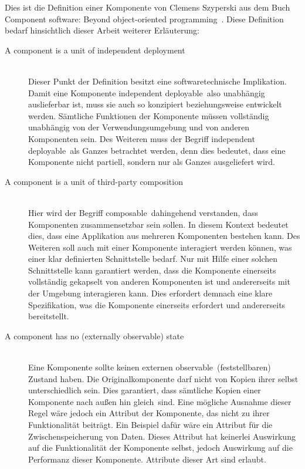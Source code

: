 Dies ist die Definition einer Komponente von Clemens Szyperski aus dem Buch \glqq Component software: Beyond object-oriented programming\grqq\ \citereset \autocite[siehe][S. 35-38]{Szyperski.2002}.
Diese Definition bedarf hinsichtlich dieser Arbeit weiterer Erläuterung:
\begin{description}
\item[A component is a unit of independent deployment] \hfill \\
Dieser Punkt der Definition besitzt eine softwaretechnische Implikation. Damit eine Komponente \glqq independent deployable\grqq\ also unabhängig auslieferbar ist, muss sie auch so konzipiert beziehungsweise entwickelt werden. Sämtliche Funktionen der Komponente müssen vollständig unabhängig von der Verwendungsumgebung und von anderen Komponenten sein. Des Weiteren muss der Begriff \glqq independent deployable\grqq\ als Ganzes betrachtet werden, denn dies bedeutet, dass eine Komponente nicht partiell, sondern nur als Ganzes ausgeliefert wird.
\item[A component is a unit of third-party composition] \hfill \\
Hier wird der Begriff \glqq composable\grqq\ dahingehend verstanden, dass Komponenten zusammensetzbar sein sollen. In diesem Kontext bedeutet dies, dass eine Applikation aus mehreren Komponenten bestehen kann. Des Weiteren soll auch mit einer Komponente interagiert werden können, was einer klar definierten Schnittstelle bedarf. Nur mit Hilfe einer solchen Schnittstelle kann garantiert werden, dass die Komponente einerseits vollständig gekapselt von anderen Komponenten ist und andererseits mit der Umgebung interagieren kann. Dies erfordert demnach eine klare Spezifikation, was die Komponente einerseits erfordert und andererseits bereitstellt.
\item[A component has no (externally observable) state] \hfill \\
Eine Komponente sollte keinen externen \glqq observable\grqq\ (feststellbaren) Zustand haben. Die Originalkomponente darf nicht von Kopien ihrer selbst unterschiedlich sein. Dies garantiert, dass sämtliche Kopien einer Komponente nach außen hin \glqq gleich\grqq\ sind.
Eine mögliche Ausnahme dieser Regel wäre jedoch ein Attribut der Komponente, das nicht zu ihrer Funktionalität beiträgt. Ein Beispiel dafür wäre ein Attribut für die Zwischenspeicherung von Daten. Dieses Attribut hat keinerlei Auswirkung auf die Funktionalität der Komponente selbst, jedoch Auswirkung auf die Performanz dieser Komponente. Attribute dieser Art sind erlaubt.
\end{description}


